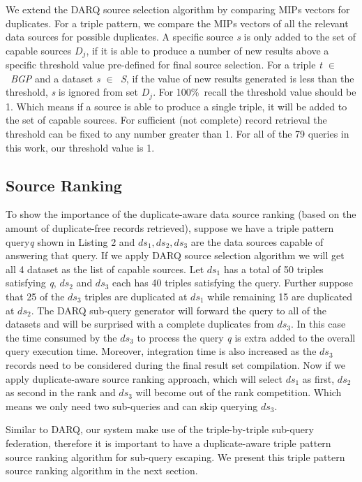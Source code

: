 \documentclass{sig-alternate}  %
\begin{document}
We extend the DARQ source selection algorithm by comparing MIPs vectors
 for duplicates. For a triple pattern, we compare the MIPs
vectors of all the relevant data sources for possible duplicates.
A specific source \emph{s} is only added to the set of capable sources $D_j$,
if it is able to produce a number of new results above a specific threshold value
pre-defined for final source selection. For a triple \emph{t $\in$\ BGP} and a dataset \emph{s $\in$\ S}, if the value of new results generated
is less than the threshold, \emph{s} is ignored from set $D_j$. For 100\%\ recall the threshold value should be 1. Which means if a source is able to produce a single triple, it will be added to the set of capable sources. For sufficient (not complete) record retrieval the threshold can be fixed to any number greater than 1. For all of the 79 queries in this work, our threshold value is 1. 

\subsection{Source Ranking} 
To show the importance of the duplicate-aware data source ranking (based on the amount of duplicate-free records retrieved), suppose we have a triple pattern query\emph{q} shown in Listing 2  and \emph{$ ds_1, ds_2, ds_3 $} are the data sources capable of answering that query. If we apply DARQ source selection algorithm we will get all 4 dataset as the list of capable sources. Let $ds_1$ has a total of 50 triples satisfying \emph{q}, $ds_2$ and $ds_3$ each has 40 triples satisfying the query. Further suppose that 25 of the $ds_3$ triples are duplicated at $ds_1$ while remaining 15 are duplicated at $ds_2$. The DARQ sub-query generator will forward the query to all of the datasets and will be surprised with a complete duplicates from $ds_3$. In this case the time consumed by the $ds_3$ to process the query \emph{q} is extra added to the overall query execution time. Moreover, integration time is also increased as the $ds_3$ records need to be considered during the final result set compilation. Now if we apply duplicate-aware source ranking approach, which will select $ds_1$ as first, $ds_2$ as second in the rank and $ds_3$ will become out of the rank competition. Which means we only need two sub-queries and can skip querying $ds_3$. 

Similar to DARQ, our system make use of the triple-by-triple sub-query federation, therefore it is important to have a duplicate-aware triple pattern source ranking algorithm for sub-query escaping. We present this triple pattern source ranking algorithm in the next section. 
\end{document}
